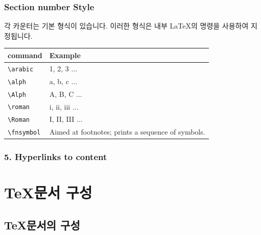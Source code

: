 \documentclass[12pt, a4paper, oneside]{book}
\let\stdsection\section
\renewcommand\section{\newpage\stdsection}
\begin{document}
			\subsection{Section number Style}
			
			각 카운터는 기본 형식이 있습니다. 이러한 형식은 내부 LaTeX의 명령을 사용하여 지정됩니다.
			
			\begin{table}[hbp]
			\centering 
			\begin{tabular}{ p{} p{} }
			\toprule
			command	&Example\\
			\midrule
			\verb|\arabic|	&1, 2, 3 ...\\
			\verb|\alph|	 	&a, b, c ...\\
			\verb|\Alph|		&A, B, C ...\\
			\verb|\roman|	&i, ii, iii ...\\
			\verb|\Roman|	&I, II, III ...\\
			\verb|\fnsymbol|	&Aimed at footnotes; prints a sequence of symbols.\\
			\bottomrule
			\end{tabular} 
			\end{table}






			
			\newpage  \null
			\subsection{5. Hyperlinks to content}
	
	



	\newpage
	\chapter{\TeX 문서 구성}


		\minitoc				%
		\doublespace





	\newpage 
	\section{\TeX 문서의 구성}
	\null
	
\end{document}
